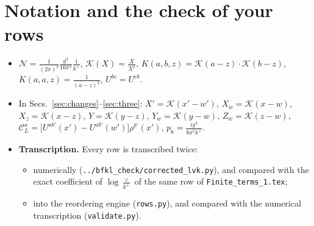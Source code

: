 \documentclass[10pt]{article}
\numberwithin{equation}{section}
\newcommand{\KK}{\mathcal K}
\newcommand{\CL}{\mathcal C_L}
\newcommand{\NN}{\mathcal N}
\newcommand{\pre}{\frac{1}{(2\pi)^3}}
\begin{document}
\section{Notation and the check of your rows}\label{sec:notation}
\begin{itemize}
\item $\NN=\pre\frac{g^4}{16\pi^5}\frac1{k^+}$, $\KK(X)=\frac{X}{X^2}$, $K(a,b,z)=\KK(a-z)\cdot\KK(b-z)$, $K(a,a,z)=\frac{1}{(a-z)^2}$, $U^{bc}=U^{cb}$.
\item In Secs.~\ref{sec:changes}--\ref{sec:three}: $X'=\KK(x'-w')$, $X_w=\KK(x-w)$, $X_z=\KK(x-z)$, $Y=\KK(y-z)$, $Y_w=\KK(y-w)$, $Z_w=\KK(z-w)$, $\CL^a=\big[U^{ab'}(x')-U^{ab'}(w')\big]\rho^{b'}(x')$, $p_8=\frac{ig^4}{8\pi^5k^+}$.
\item \textbf{Transcription.} Every row is transcribed twice:
\begin{itemize}
\item numerically (\texttt{../bfkl\_check/corrected\_lvk.py}), and compared with the exact coefficient of $\log\frac{\vee}{k^+}$ of the same row of \texttt{Finite\_terms\_1.tex};
\item into the reordering engine (\texttt{rows.py}), and compared with the numerical transcription (\texttt{validate.py}).
\end{itemize}
\end{itemize}
\end{document}

